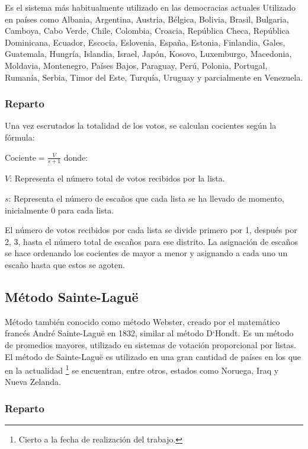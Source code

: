 \documentclass[12pt,a4paper,]{book}
\let\rmarkdownfootnote\footnote%
\def\footnote{\protect\rmarkdownfootnote}
\numberwithin{dummy}{section}
\theoremstyle{ocrenumbox}
\theoremstyle{blacknumex}
\theoremstyle{blacknumbox}
\theoremstyle{ocrenum}
\theoremstyle{ocrenum}
\begin{document}
Es el sistema más habitualmente utilizado en las democracias actuales
Utilizado en países como Albania, Argentina, Austria, Bélgica, Bolivia,
Brasil, Bulgaria, Camboya, Cabo Verde, Chile, Colombia, Croacia,
República Checa, República Dominicana, Ecuador, Escocia, Eslovenia,
España, Estonia, Finlandia, Gales, Guatemala, Hungría, Islandia, Israel,
Japón, Kosovo, Luxemburgo, Macedonia, Moldavia, Montenegro, Países
Bajos, Paraguay, Perú, Polonia, Portugal, Rumanía, Serbia, Timor del
Este, Turquía, Uruguay y parcialmente en Venezuela.

\hypertarget{reparto}{%
\subsubsection{Reparto}\label{reparto}}

Una vez escrutados la totalidad de los votos, se calculan cocientes
según la fórmula:

\(\textrm{Cociente} = \frac{V}{s+1}\) donde:

\(V\): Representa el número total de votos recibidos por la lista.

\(s\): Representa el número de escaños que cada lista se ha llevado de
momento, inicialmente 0 para cada lista.

El número de votos recibidos por cada lista se divide primero por 1,
después por 2, 3, hasta el número total de escaños para ese distrito. La
asignación de escaños se hace ordenando los cocientes de mayor a menor y
asignando a cada uno un escaño hasta que estos se agoten.

\hypertarget{muxe9todo-sainte-laguuxeb}{%
\subsection{Método Sainte-Laguë}\label{muxe9todo-sainte-laguuxeb}}

Método también conocido como método Webster, creado por el matemático
francés André Sainte-Laguë en 1832, similar al método D`Hondt. Es un
método de promedios mayores, utilizado en sistemas de votación
proporcional por listas.\\
El método de Sainte-Laguë es utilizado en una gran cantidad de países en
los que en la actualidad \footnote{Cierto a la fecha de realización del
  trabajo.} se encuentran, entre otros, estados como Noruega, Iraq y
Nueva Zelanda.

\hypertarget{reparto-1}{%
\subsubsection{Reparto}\label{reparto-1}}
\end{document}
